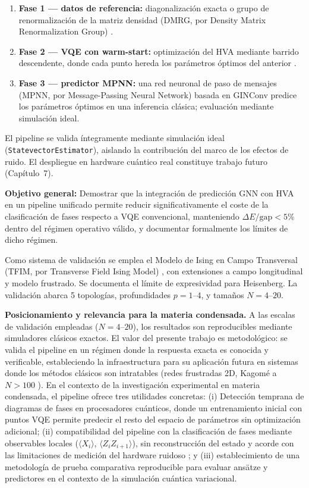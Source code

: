 \documentclass[11pt,a4paper,spanish]{book}
\begin{document}
\begin{enumerate}
    \item \textbf{Fase 1 --- datos de referencia:} diagonalización exacta o grupo de renormalización de la matriz densidad (DMRG, por Density Matrix Renormalization Group) \citep{schollwock2011}.
    \item \textbf{Fase 2 --- VQE con warm-start:} optimización del HVA mediante barrido descendente, donde cada punto hereda los parámetros óptimos del anterior \citep{puig2025, mele2022}.
    \item \textbf{Fase 3 --- predictor MPNN:} una red neuronal de paso de mensajes (MPNN, por Message-Passing Neural Network) basada en GINConv \citep{xu2019} predice los parámetros óptimos en una inferencia clásica; evaluación mediante simulación ideal.
\end{enumerate}

El pipeline se valida íntegramente mediante simulación ideal (\texttt{StatevectorEstimator}), aislando la contribución del marco de los efectos de ruido. El despliegue en hardware cuántico real constituye trabajo futuro (Capítulo~7).

\textbf{Objetivo general:} Demostrar que la integración de predicción GNN con HVA en un pipeline unificado permite reducir significativamente el coste de la clasificación de fases respecto a VQE convencional, manteniendo $\Delta E/\text{gap} < 5\%$ dentro del régimen operativo válido, y documentar formalmente los límites de dicho régimen.

Como sistema de validación se emplea el Modelo de Ising en Campo Transversal (TFIM, por Transverse Field Ising Model) \citep{dutta2015}, con extensiones a campo longitudinal y modelo frustrado. Se documenta el límite de expresividad para Heisenberg. La validación abarca 5 topologías, profundidades $p = 1$--$4$, y tamaños $N = 4$--$20$.

\textbf{Posicionamiento y relevancia para la materia condensada.} A las escalas de validación empleadas ($N = 4$--$20$), los resultados son reproducibles mediante simuladores clásicos exactos. El valor del presente trabajo es metodológico: se valida el pipeline en un régimen donde la respuesta exacta es conocida y verificable, estableciendo la infraestructura para su aplicación futura en sistemas donde los métodos clásicos son intratables (redes frustradas 2D, Kagomé a $N > 100$ \citep{ahsan2025}). En el contexto de la investigación experimental en materia condensada, el pipeline ofrece tres utilidades concretas: (i) Detección temprana de diagramas de fases en procesadores cuánticos, donde un entrenamiento inicial con puntos VQE permite predecir el resto del espacio de parámetros sin optimización adicional; (ii) compatibilidad del pipeline con la clasificación de fases mediante observables locales ($\langle X_i \rangle$, $\langle Z_i Z_{i+1} \rangle$), sin reconstrucción del estado y acorde con las limitaciones de medición del hardware ruidoso \citep{sharma2026}; y (iii) establecimiento de una metodología de prueba comparativa reproducible para evaluar ansätze y predictores en el contexto de la simulación cuántica variacional.
\end{document}

